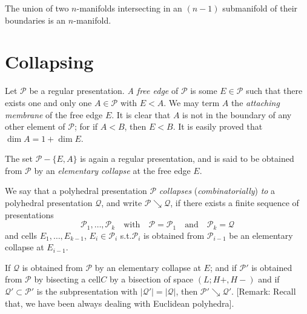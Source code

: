 \begin{ex}\label{chap6-ex6.5.15}
The union of two $n$-manifolds intersecting in an $(n-1)$ submanifold of their boundaries is an $n$-manifold.
\end{ex}

\section{Collapsing}\label{chap6-sec6.6}

\begin{definition}\label{chap6-defi6.6.1}
Let $\mathscr{P}$ be a regular presentation. {\em A free edge} of $\mathscr{P}$ is some $E\in\mathscr{P}$ such that there exists one and only one $A\in\mathscr{P}$ with $E<A$. We may term $A$ the {\em attaching membrane} of the free edge $E$. It is clear that $A$ is not in the boundary of any other element of $\mathscr{P}$; for if $A<B$, then $E<B$. It is easily proved that $\dim A=1+\dim E$.
\end{definition}

The set $\mathscr{P}-\{E,A\}$ is again a regular presentation, and is said to be obtained from $\mathscr{P}$ by an {\em elementary collapse} at the free edge $E$.

\begin{definition}\label{chap6-defi6.6.2}
We say that a polyhedral presentation $\mathscr{P}$ {\em collapses} ({\em combinatorially}) {\em to} a polyhedral presentation $\mathcal{Q}$, and write $\mathscr{P}\searrow \mathcal{Q}$, if there exists a finite sequence of presentations
$$
\mathscr{P}_{1},\ldots,\mathscr{P}_{k}\quad\text{with}\quad \mathscr{P}=\mathscr{P}_{1}\quad\text{and}\quad \mathscr{P}_{k}=\mathcal{Q}
$$
and cells $E_{1},\ldots,E_{k-1}$, $E_{i}\in\mathscr{P}_{i}$ s.t.\@ $\mathscr{P}_{i}$ is obtained from $\mathscr{P}_{i-1}$ be an elementary collapse at $E_{i-1}$.
\end{definition}

\begin{proposition}\label{chap6-prop6.6.3}
If $\mathcal{Q}$ is obtained from $\mathscr{P}$ by an elementary collapse at $E$; and if $\mathscr{P}'$ is obtained from $\mathscr{P}$ by bisecting a cell\pageoriginale $C$ by a bisection of space $(L;H+,H-)$ and if $\mathcal{Q}'\subset \mathscr{P}'$ is the subpresentation with $|\mathcal{Q}'|=|\mathcal{Q}|$, then $\mathscr{P}'\searrow \mathcal{Q}'$. [Remark: Recall that, we have been always dealing with Euclidean polyhedra].
\end{proposition}

